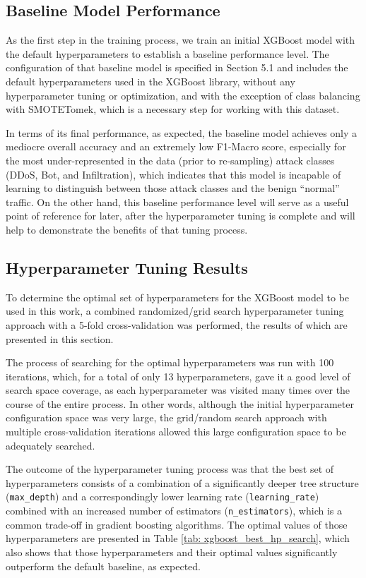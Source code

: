 \subsection{Baseline Model Performance}

As the first step in the training process, we train an initial XGBoost model with the default hyperparameters to establish a baseline performance level. The configuration of that baseline model is specified in Section 5.1 and includes the default hyperparameters used in the XGBoost library, without any hyperparameter tuning or optimization, and with the exception of class balancing with SMOTETomek, which is a necessary step for working with this dataset.

In terms of its final performance, as expected, the baseline model achieves only a mediocre overall accuracy and an extremely low F1-Macro score, especially for the most under-represented in the data (prior to re-sampling) attack classes (DDoS, Bot, and Infiltration), which indicates that this model is incapable of learning to distinguish between those attack classes and the benign “normal” traffic. On the other hand, this baseline performance level will serve as a useful point of reference for later, after the hyperparameter tuning is complete and will help to demonstrate the benefits of that tuning process.

\subsection{Hyperparameter Tuning Results}

To determine the optimal set of hyperparameters for the XGBoost model to be used in this work, a combined randomized/grid search hyperparameter tuning approach with a 5-fold cross-validation was performed, the results of which are presented in this section.

The process of searching for the optimal hyperparameters was run with 100 iterations, which, for a total of only 13 hyperparameters, gave it a good level of search space coverage, as each hyperparameter was visited many times over the course of the entire process. In other words, although the initial hyperparameter configuration space was very large, the grid/random search approach with multiple cross-validation iterations allowed this large configuration space to be adequately searched.

The outcome of the hyperparameter tuning process was that the best set of hyperparameters consists of a combination of a significantly deeper tree structure (\texttt{max\_depth}) and a correspondingly lower learning rate (\texttt{learning\_rate}) combined with an increased number of estimators (\texttt{n\_estimators}), which is a common trade-off in gradient boosting algorithms. The optimal values of those hyperparameters are presented in Table \ref{tab: xgboost_best_hp_search}, which also shows that those hyperparameters and their optimal values significantly outperform the default baseline, as expected.

